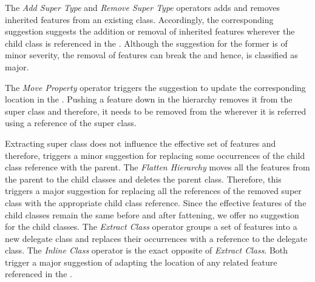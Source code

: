 The \textit{Add Super Type} and \textit{Remove Super Type} operators adds and removes inherited features from an existing class. Accordingly, the corresponding suggestion suggests the addition or removal of inherited features wherever the child class is referenced in the \viewtype. Although the suggestion for the former is of minor severity, the removal of features can break the \viewtype and hence, is classified as major.

The \textit{Move Property} operator triggers the suggestion to update the corresponding location in the \viewtype. Pushing a feature down in the hierarchy removes it from the super class and therefore, it needs to be removed from the \viewtype wherever it is referred using a reference of the super class.

Extracting super class does not influence the effective set of features and therefore, triggers a minor suggestion for replacing some occurrences of the child class reference with the parent. The \textit{Flatten Hierarchy} moves all the features from the parent to the child classes and deletes the parent class. Therefore, this triggers a major suggestion for replacing all the references of the removed super class with the appropriate child class reference. Since the effective features of the child classes remain the same before and after fattening, we offer no suggestion for the child classes. The \textit{Extract Class} operator groups a set of features into a new delegate class and replaces their occurrences with a reference to the delegate class. The \textit{Inline Class} operator is the exact opposite of \textit{Extract Class}. Both trigger a major suggestion of adapting the location of any related feature referenced in the \viewtype.

